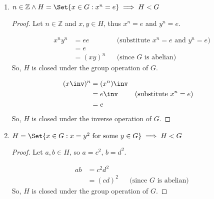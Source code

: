 \begin{enumerate}[label={\Alph*.},font={\bfseries}]
\begin{enumerate}[label={\arabic*},font={\bfseries}]
\begin{proof}
      \begin{align*}
        \forall x \in H(x = x\inv) &\implies x \in H \land x\inv \in H
      \end{align*}
      So, $H$ is closed under the inverse operation of $G$.
    \end{proof}
  \item
    \begin{theorem}
      $n \in \mathbb{Z} \land H = \Set{x \in G : x^n = e} \implies H < G$
    \end{theorem}
    \begin{proof}
      Let $n \in \mathbb{Z}$ and $x, y \in H$, thus $x^n = e$ and $y^n = e$.

      \begin{align*}
        x^ny^n &= ee && \text{(substitute $x^n = e$ and $y^n = e$)} \\
        &= e \\
        &= (xy)^n && \text{(since $G$ is abelian)}
      \end{align*}
      So, $H$ is closed under the group operation of $G$.

      \begin{align*}
        (x\inv)^n &= (x^n)\inv \\
        &= e\inv && \text{(substitute $x^n = e$)} \\
        &= e
      \end{align*}
      So, $H$ is closed under the inverse operation of $G$.
    \end{proof}
  \item
    \begin{theorem}
      $H = \Set{x \in G : x = y^2\text{ for some }y \in G} \implies H < G$
    \end{theorem}
    \begin{proof}
      Let $a, b \in H$, so $a = c^2$, $b = d^2$.

      \begin{align*}
        ab &= c^2d^2 \\
        &= (cd)^2 && \text{(since $G$ is abelian)}
      \end{align*}
      So, $H$ is closed under the group operation of $G$.


\end{proof}
\end{enumerate}
\end{enumerate}
